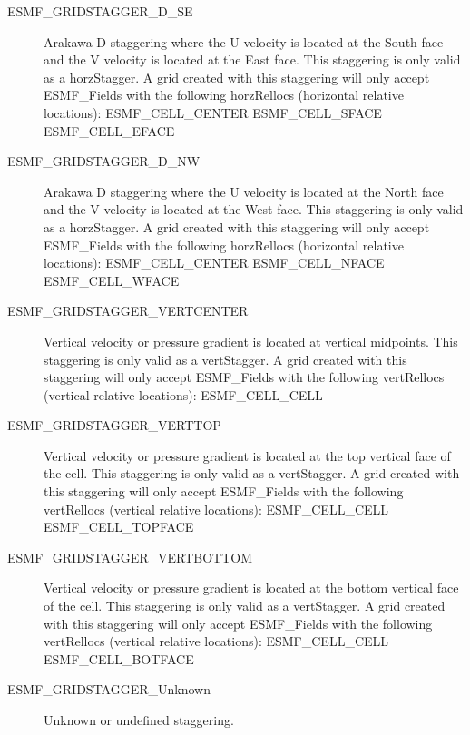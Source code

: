 \begin{description}
   \item [ESMF\_GRIDSTAGGER\_D\_SE]
         Arakawa D staggering where the U velocity is located at the South face
         and the V velocity is located at the East face.  This staggering is
         only valid as a horzStagger.  A grid created with this staggering will
         only accept ESMF\_Fields with the following horzRellocs (horizontal
         relative locations):
             ESMF\_CELL\_CENTER
             ESMF\_CELL\_SFACE
             ESMF\_CELL\_EFACE

   \item [ESMF\_GRIDSTAGGER\_D\_NW]
         Arakawa D staggering where the U velocity is located at the North face
         and the V velocity is located at the West face.  This staggering is
         only valid as a horzStagger.  A grid created with this staggering will
         only accept ESMF\_Fields with the following horzRellocs (horizontal
         relative locations):
             ESMF\_CELL\_CENTER
             ESMF\_CELL\_NFACE
             ESMF\_CELL\_WFACE

   \item [ESMF\_GRIDSTAGGER\_VERTCENTER] 
         Vertical velocity or pressure gradient is located at vertical midpoints.
         This staggering is only valid as a vertStagger.  A grid created with
         this staggering will only accept ESMF\_Fields with the following
         vertRellocs (vertical relative locations):
             ESMF\_CELL\_CELL

   \item [ESMF\_GRIDSTAGGER\_VERTTOP]
         Vertical velocity or pressure gradient is located at the top vertical 
         face of the cell.  This staggering is only valid as a vertStagger.
         A grid created with this staggering will only accept ESMF\_Fields with
         the following vertRellocs (vertical relative locations):
             ESMF\_CELL\_CELL
             ESMF\_CELL\_TOPFACE

   \item [ESMF\_GRIDSTAGGER\_VERTBOTTOM]
         Vertical velocity or pressure gradient is located at the bottom vertical 
         face of the cell.  This staggering is only valid as a vertStagger.
         A grid created with this staggering will only accept ESMF\_Fields with
         the following vertRellocs (vertical relative locations):
             ESMF\_CELL\_CELL
             ESMF\_CELL\_BOTFACE

   \item [ESMF\_GRIDSTAGGER\_Unknown]
         Unknown or undefined staggering.

\end{description}

